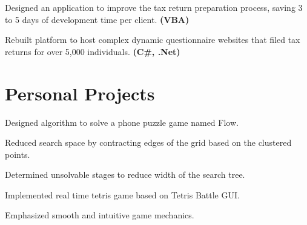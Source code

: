 \documentclass[letterpaper]{kevin-resume} %
\begin{document}
\begin{minipage}[t]{0.63\textwidth}
\sectionspace %


\begin{tightitemize}
	\item Designed an application to improve the tax return preparation process, saving 3 to 5 days of development time per client. \textbf{(VBA)}
	\item Rebuilt platform to host complex dynamic questionnaire websites that filed tax returns for over 5,000 individuals. \textbf{(C\#, .Net)}
\end{tightitemize}

\sectionspace %


\sectionspace %

\section{Personal Projects}

\begin{tightitemize}
	\item Designed algorithm to solve a phone puzzle game named Flow.
 	\item Reduced search space by contracting edges of the grid based on the clustered points.
 	\item Determined unsolvable stages to reduce width of the search tree.
\end{tightitemize}

\sectionspace %


\begin{tightitemize}
	\item Implemented real time tetris game based on Tetris Battle GUI.
	\item Emphasized smooth and intuitive game mechanics.
\end{tightitemize}

\sectionspace %


\end{minipage} %
\end{document}
